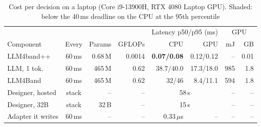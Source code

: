 \begin{table}[t]
\centering
\begin{threeparttable}
\caption{Cost per decision on a laptop (Core i9-13900H, RTX 4080 Laptop GPU). Shaded: below the 40\,ms deadline on the CPU at the 95th percentile}
\label{tab:cost}
\footnotesize
\setlength{\tabcolsep}{2.3pt}
\begin{tabular}{@{}l c r r r r r r@{}}
\toprule
& & & & \multicolumn{2}{c}{Latency p50/p95 (ms)} & \multicolumn{2}{c}{GPU} \\ \cmidrule(lr){5-6}\cmidrule(l){7-8}
Component & Every & Params & GFLOPs & CPU & GPU & mJ & GB \\
\midrule
LLM4band++ & 60\,ms & 0.68\,M & 0.0014 & \cellcolor{favour}\bfseries 0.07/0.08 & 0.12/0.12 & -- & 0.01 \\
LLM, 1 tok. & 60\,ms & 465\,M & 0.62 & 38.7/40.0 & 17.3/18.0 & 985 & 1.8 \\
LLM4Band & 60\,ms & 465\,M & 0.62 & 32/46 & 8.4/11.1 & 594 & 1.8 \\
\midrule
Designer, hosted & stack & -- & -- & \multicolumn{2}{c}{58\,s} & -- & -- \\
Designer, 32B & stack & 32\,B & -- & \multicolumn{2}{c}{15\,s} & -- & -- \\
Adapter it writes & 60\,ms & -- & -- & 0.33\,$\mu$s & -- & -- & -- \\
\bottomrule
\end{tabular}

\end{threeparttable}
\end{table}